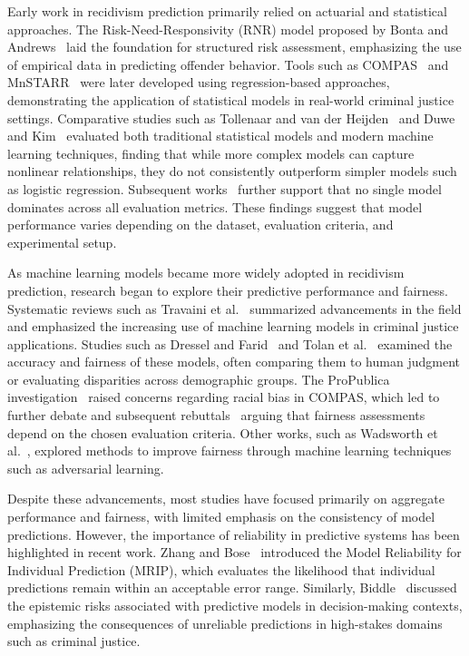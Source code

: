 \documentclass{article}
\begin{document}
Early work in recidivism prediction primarily relied on actuarial and statistical approaches. The Risk-Need-Responsivity (RNR) model proposed by Bonta and Andrews~\cite{bonta2007risk} laid the foundation for structured risk assessment, emphasizing the use of empirical data in predicting offender behavior. Tools such as COMPAS~\cite{northpointe2015practitioner} and MnSTARR~\cite{duwe2014development} were later developed using regression-based approaches, demonstrating the application of statistical models in real-world criminal justice settings. Comparative studies such as Tollenaar and van der Heijden~\cite{tollenaar2013method} and Duwe and Kim~\cite{kim2023black} evaluated both traditional statistical models and modern machine learning techniques, finding that while more complex models can capture nonlinear relationships, they do not consistently outperform simpler models such as logistic regression. Subsequent works~\cite{ozkan2017predicting,ngo2018traditional,kovalchuk2023prediction} further support that no single model dominates across all evaluation metrics. These findings suggest that model performance varies depending on the dataset, evaluation criteria, and experimental setup.

As machine learning models became more widely adopted in recidivism prediction, research began to explore their predictive performance and fairness. Systematic reviews such as Travaini et al.~\cite{travaini2022machine} summarized advancements in the field and emphasized the increasing use of machine learning models in criminal justice applications. Studies such as Dressel and Farid~\cite{dressel2018accuracy} and Tolan et al.~\cite{tolan2019machine} examined the accuracy and fairness of these models, often comparing them to human judgment or evaluating disparities across demographic groups. The ProPublica investigation~\cite{propublica2016analysis} raised concerns regarding racial bias in COMPAS, which led to further debate and subsequent rebuttals~\cite{dieterich2016compas,corbett2017algorithmic,flores2016false} arguing that fairness assessments depend on the chosen evaluation criteria. Other works, such as Wadsworth et al.~\cite{wadsworth2018achieving}, explored methods to improve fairness through machine learning techniques such as adversarial learning.

Despite these advancements, most studies have focused primarily on aggregate performance and fairness, with limited emphasis on the consistency of model predictions. However, the importance of reliability in predictive systems has been highlighted in recent work. Zhang and Bose~\cite{zhang2024reliability} introduced the Model Reliability for Individual Prediction (MRIP), which evaluates the likelihood that individual predictions remain within an acceptable error range. Similarly, Biddle~\cite{biddle2022predicting} discussed the epistemic risks associated with predictive models in decision-making contexts, emphasizing the consequences of unreliable predictions in high-stakes domains such as criminal justice.
\end{document}
